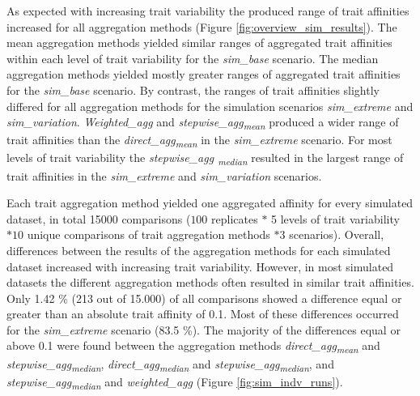 \documentclass{article}
\begin{document}
As expected with increasing trait variability the produced range of trait affinities increased for all aggregation methods (Figure \ref{fig:overview_sim_results}). The mean aggregation methods yielded similar ranges of aggregated trait affinities within each level of trait variability for the \textit{sim\_base} scenario. The median aggregation methods yielded mostly greater ranges of aggregated trait affinities for the \textit{sim\_base} scenario. By contrast, the ranges of trait affinities slightly differed for all aggregation methods for the simulation scenarios \textit{sim\_extreme} and \textit{sim\_variation}. \textit{Weighted\_agg} and \textit{stepwise\_agg\textsubscript{mean}} produced a wider range of trait affinities than the \textit{direct\_agg\textsubscript{mean}} in the \textit{sim\_extreme} scenario. For most levels of trait variability the \textit{stepwise\_agg \textsubscript{median}} resulted in the largest range of trait affinities in the \textit{sim\_extreme} and \textit{sim\_variation} scenarios.

Each trait aggregation method yielded one aggregated affinity for every simulated dataset, in total 15000 comparisons ($100$ replicates $*$ 5 levels of trait variability $* 10$ unique comparisons of trait aggregation methods $* 3$ scenarios). Overall, differences between the results of the aggregation methods for each simulated dataset increased with increasing trait variability. However, in most simulated datasets the different aggregation methods often resulted in similar trait affinities. Only 1.42 \% (213 out of 15.000) of all comparisons showed a difference equal or greater than an absolute trait affinity of 0.1. Most of these differences occurred for the \textit{sim\_extreme} scenario (83.5 \%). The majority of the differences equal or above 0.1 were found between the aggregation methods \textit{direct\_agg\textsubscript{mean}} and \textit{stepwise\_agg\textsubscript{median}}, \textit{direct\_agg\textsubscript{median}} and \textit{stepwise\_agg\textsubscript{median}}, and \textit{stepwise\_agg\textsubscript{median}} and \textit{weighted\_agg} (Figure \ref{fig:sim_indv_runs}). 
\end{document}
